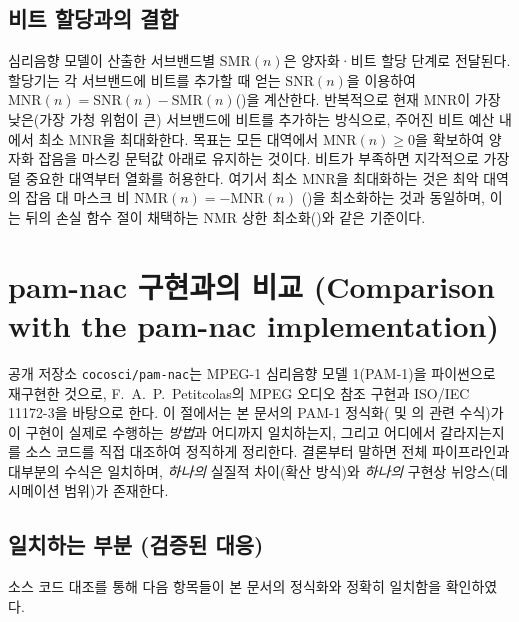 \documentclass[11pt,a4paper]{article}
\newcommand{\SMR}{\mathrm{SMR}}                        %
\newcommand{\MNR}{\mathrm{MNR}}                        %
\newcommand{\NMR}{\mathrm{NMR}}                        %
\newcommand{\SNR}{\mathrm{SNR}}                        %
\begin{document}
\subsection{비트 할당과의 결합}
심리음향 모델이 산출한 서브밴드별 $\SMR(n)$은 양자화·비트 할당 단계로 전달된다.
할당기는 각 서브밴드에 비트를 추가할 때 얻는 $\SNR(n)$을 이용하여
$\MNR(n)=\SNR(n)-\SMR(n)$()을 계산한다. 반복적으로 현재
$\MNR$이 가장 낮은(가장 가청 위험이 큰) 서브밴드에 비트를 추가하는 방식으로,
주어진 비트 예산 내에서 최소 $\MNR$을 최대화한다. 목표는 모든 대역에서
$\MNR(n)\ge 0$을 확보하여 양자화 잡음을 마스킹 문턱값 아래로 유지하는 것이다.
비트가 부족하면 지각적으로 가장 덜 중요한 대역부터 열화를 허용한다. 여기서 최소
$\MNR$을 최대화하는 것은 최악 대역의 잡음 대 마스크 비 $\NMR(n)=-\MNR(n)$
()을 최소화하는 것과 동일하며, 이는 뒤의 손실 함수 절이 채택하는
NMR 상한 최소화()와 같은 기준이다.

\section{pam-nac 구현과의 비교 (Comparison with the pam-nac implementation)}\label{sec:comparison}
공개 저장소 \texttt{cocosci/pam-nac}\cite{pamnac}는 MPEG-1 심리음향 모델
1(PAM-1)을 파이썬으로 재구현한 것으로, F.~A.~P.~Petitcolas의 MPEG 오디오 참조
구현\cite{petitcolas}과 ISO/IEC 11172-3\cite{iso11172}을 바탕으로 한다. 이 절에서는
본 문서의 PAM-1 정식화( 및 의 관련 수식)가 이 구현이
실제로 수행하는 \emph{방법}과 어디까지 일치하는지, 그리고 어디에서 갈라지는지를
소스 코드를 직접 대조하여 정직하게 정리한다. 결론부터 말하면 전체 파이프라인과
대부분의 수식은 일치하며, \emph{하나의} 실질적 차이(확산 방식)와 \emph{하나의}
구현상 뉘앙스(데시메이션 범위)가 존재한다.

\subsection{일치하는 부분 (검증된 대응)}
소스 코드 대조를 통해 다음 항목들이 본 문서의 정식화와 정확히 일치함을 확인하였다.
\end{document}
